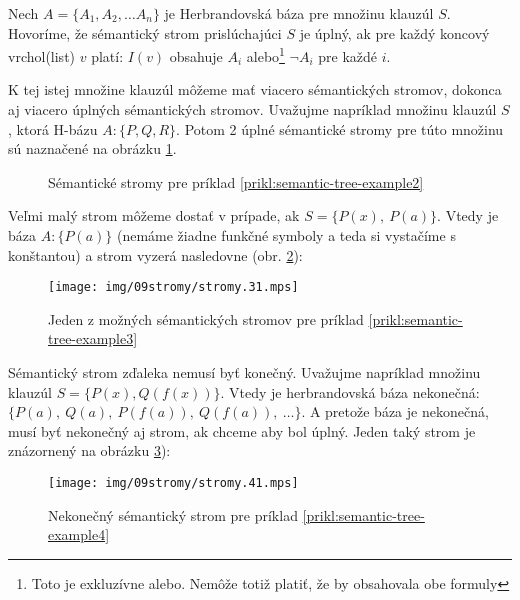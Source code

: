\begin{definicia}
    Nech $A=\{ A_1, A_2, \ldots A_n \}$ je Herbrandovská báza pre množinu
    klauzúl $S$.
    Hovoríme, že sémantický strom prislúchajúci $S$ je úplný,
    ak pre každý koncový vrchol(list) $v$ platí:
    $I(v)$ obsahuje $A_i$ alebo\footnote{Toto je exkluzívne alebo. Nemôže
    totiž platiť, že by obsahovala obe formuly} $\neg A_i$ pre každé $i$.
\end{definicia}

\begin{priklad}
    \label{prikl:semantic-tree-example2}
    K tej istej množine klauzúl môžeme mať viacero sémantických stromov,
    dokonca aj viacero úplných sémantických stromov.
    Uvažujme napríklad množinu klauzúl $S$, ktorá H-bázu $A: \{ P, Q, R \}$.
    Potom 2 úplné sémantické stromy pre túto množinu sú naznačené na
    obrázku
    \ref{fig:semantic-tree-example2}.

    \begin{figure}[h]
        \centering
        \caption{Sémantické stromy pre príklad
                \ref{prikl:semantic-tree-example2}}
        \label{fig:semantic-tree-example2}
    \end{figure}
\end{priklad}


\begin{priklad}
    \label{prikl:semantic-tree-example3}
    Veľmi malý strom môžeme dostať v prípade, ak $S=\{P(x),\ P(a)\}$. Vtedy
    je báza $A:\{P(a)\}$ (nemáme žiadne funkčné symboly a teda si vystačíme
    s konštantou) a strom vyzerá nasledovne (obr.
    \ref{fig:semantic-tree-example3}):

    \begin{figure}[h]
        \centering
        \texttt{[image: img/09stromy/stromy.31.mps]}
        \caption{Jeden z možných sémantických stromov pre príklad
                \ref{prikl:semantic-tree-example3}}
        \label{fig:semantic-tree-example3}
    \end{figure}
\end{priklad}

\begin{priklad}
    \label{prikl:semantic-tree-example4}
    Sémantický strom zďaleka nemusí byť konečný. Uvažujme napríklad množinu
    klauzúl $S=\{P(x), Q(f(x)) \}$.
    Vtedy je herbrandovská báza nekonečná: 
    $\{ P(a),\ Q(a),\ P(f(a)),\ Q(f(a)),\ \ldots \}$.
    A pretože báza je nekonečná, musí byť nekonečný aj strom, ak chceme aby
    bol úplný. Jeden taký strom je znázornený na obrázku
    \ref{fig:semantic-tree-example4}):

    \begin{figure}[h]
        \centering
        \texttt{[image: img/09stromy/stromy.41.mps]}
        \caption{Nekonečný sémantický strom pre príklad
                \ref{prikl:semantic-tree-example4}}
        \label{fig:semantic-tree-example4}
    \end{figure}
\end{priklad}

